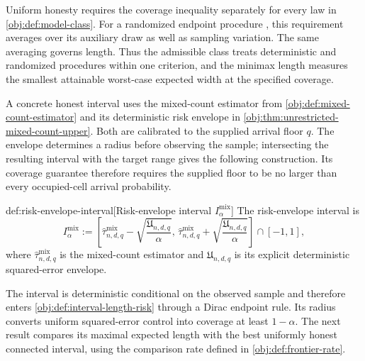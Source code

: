 Uniform honesty requires the coverage inequality separately for every law in \cref{obj:def:model-class}. For a randomized endpoint procedure , this requirement averages over its auxiliary draw as well as sampling variation. The same averaging governs length. Thus the admissible class  treats deterministic and randomized procedures within one criterion, and the minimax length  measures the smallest attainable worst-case expected width at the specified coverage.

A concrete honest interval uses the mixed-count estimator  from \cref{obj:def:mixed-count-estimator} and its deterministic risk envelope  in \cref{obj:thm:unrestricted-mixed-count-upper}. Both are calibrated to the supplied arrival floor \(q\). The envelope determines a radius before observing the sample; intersecting the resulting interval with the target range gives the following construction. Its coverage guarantee therefore requires the supplied floor to be no larger than every occupied-cell arrival probability.

\begin{definitionv}{def:risk-envelope-interval}[Risk-envelope interval \(I^{\mathrm{mix}}_\alpha\)]
The risk-envelope interval is
\[
I^{\mathrm{mix}}_\alpha
:=
\left[
\widehat\tau^{\mathrm{mix}}_{n,d,q}
-
\sqrt{\frac{\mathfrak U_{n,d,q}}{\alpha}},
\,
\widehat\tau^{\mathrm{mix}}_{n,d,q}
+
\sqrt{\frac{\mathfrak U_{n,d,q}}{\alpha}}
\right]\cap[-1,1],
\]
where \(\widehat\tau^{\mathrm{mix}}_{n,d,q}\) is the mixed-count estimator and \(\mathfrak U_{n,d,q}\) is its explicit deterministic squared-error envelope.
\end{definitionv}

The interval  is deterministic conditional on the observed sample and therefore enters \cref{obj:def:interval-length-risk} through a Dirac endpoint rule. Its radius converts uniform squared-error control into coverage at least \(1-\alpha\). The next result compares its maximal expected length with the best uniformly honest connected interval, using the comparison rate  defined in \cref{obj:def:frontier-rate}.

